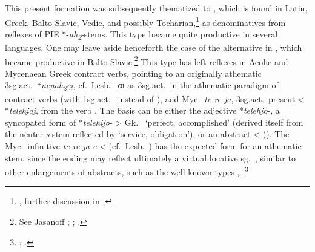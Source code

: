 \documentclass[output=paper,colorlinks,citecolor=brown]{langscibook}
\begin{document}
This present formation was subsequently thematized to , which is found in Latin, Greek, Balto-Slavic, Vedic, and possibly Tocharian,\footnote{\citealt[579]{Pinault2008}, further discussion in \citealt[393--402]{Malzahn2010}.}  as denominatives  from reflexes of PIE *-\textit{ah\textsubscript{2}}-stems. This type became quite productive in several languages. One may leave aside henceforth the case of the alternative  in , which became productive in Balto-Slavic.\footnote{See Jasanoff \citeyear[140--141]{Jasanoff2003}; \citeyear[200--201]{Jasanoff2017BSl};  \citealt[393--395]{VillanuevaSvensson2020}.} This type has left reflexes in Aeolic and Mycenaean Greek contract verbs, pointing to an originally athematic 3sg.act.\ *\textit{neu̯ah\textsubscript{2}ei̯}, cf.\  Lesb.\ {-αι}
as 3sg.act.\ in the athematic paradigm of contract verbs (with 1sg.act.\  instead of ), and Myc.\ \textit{te-re-ja}, 3sg.act.\ present < *\textit{telehi̯ai̯}, from the verb  \citep{Rau2009myc}. The basis can be either the adjective *\textit{telehi̯o}-, a syncopated form of *\textit{telehii̯o}-  > Gk.\  ‘perfect, accomplished’ (derived itself from the neuter \textit{s}-stem reflected by  ‘service, obligation’), or an abstract \mbox{} <  (\citealt[181, fn.\ 4]{Rau2009myc}). The Myc.\ infinitive \textit{te-re-ja-e}  <  (cf.\  Lesb.\ ) has the expected form for an athematic stem, since the ending may reflect ultimately a virtual locative sg.\ , similar to other enlargements of abstracts, such as the well-known types , .\footnote{\citealt[32--34, 135, 198, fn.\ 4]{Nussbaum1986}; \citealt[347--354, 380--382, 414--417]{Rieken1999}.}
\end{document}
